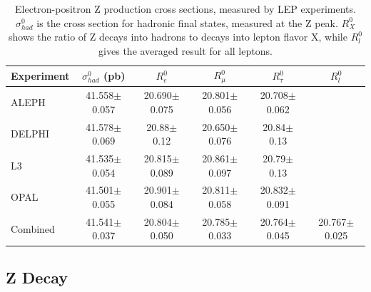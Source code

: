 \begin{table}[htbp]
  \begin{center}
    \caption[Electron-positron Z production cross sections, 
      measured by LEP experiments]
	    {Electron-positron Z production cross sections, 
	      measured by LEP experiments. 
	      $\sigma_{had}^0$ is the cross section for hadronic 
	      final states, measured at the Z peak. 
	      $R_X^0$ shows the ratio of Z decays into hadrons 
	      to decays into lepton flavor X, 
	      while $R_l^0$ gives the averaged result for all leptons.  
	    }
    \label{TableLep}
    \begin{tabular}[]{ | l | c | c | c | c | c |}
      \hline
      Experiment & $\sigma_{had}^0 $ (pb) & $R_e^0$ & $R_{\mu}^0$ & $R_{\tau}^0$ & $R_l^0$ \\ \hline \hline
      ALEPH & 41.558$\pm$0.057 & 20.690$\pm$0.075 & 20.801$\pm$0.056 & 20.708$\pm$0.062 &\\ \hline
      DELPHI & 41.578$\pm$0.069 & 20.88$\pm$0.12 & 20.650$\pm$0.076 & 20.84$\pm$0.13 &\\ \hline
      L3 & 41.535$\pm$0.054 & 20.815$\pm$0.089 & 20.861$\pm$0.097 & 20.79$\pm$0.13 &\\ \hline
      OPAL & 41.501$\pm$0.055 & 20.901$\pm$0.084 & 20.811$\pm$0.058 & 20.832$\pm$0.091 &\\ \hline
      Combined & 41.541$\pm$0.037 & 20.804$\pm$0.050 & 20.785$\pm$0.033 & 20.764$\pm$0.045 & 20.767$\pm$0.025\\ \hline
    \end{tabular}
  \end{center}
\end{table}



\subsection{Z Decay}
\label{theory:Zdec}





